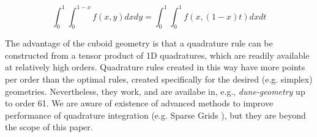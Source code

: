 \[ \int_0^1 \int_0^{1-x} f(x,y) dx dy = \int_0^1 \int_0^1 f(x, (1-x)t ) dx dt  \]

\noindent
The advantage of the cuboid geometry is that a quadrature rule can be constructed from a tensor product of 1D quadratures, which are readily available at relatively high orders. Quadrature rules created in this way have more points per order than the optimal rules, created specifically for the desired (e.g. simplex) geometries. Nevertheless, they work, and are availabe in, e.g., \textit{dune-geometry} up to order 61. We are aware of existence of advanced methods to improve performance of quadrature integration (e.g. Sparse Grids \cite{petras2000}), but they are beyond the scope of this paper. \\

